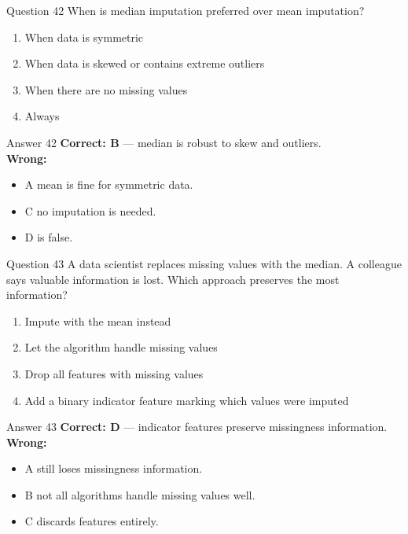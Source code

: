 \documentclass[aspectratio=169,11pt]{beamer}
\begin{document}
	\begin{frame}{Question 42}
		When is median imputation preferred over mean imputation?
		\begin{enumerate}[label=\Alph*.]
			\item When data is symmetric
			\item When data is skewed or contains extreme outliers
			\item When there are no missing values
			\item Always
		\end{enumerate}
	\end{frame}
	\begin{frame}{Answer 42}
		\textbf{Correct: B} --- median is robust to skew and outliers.\\
		\vspace{0.5em}
		\textbf{Wrong:}
		\begin{itemize}
			\item A mean is fine for symmetric data.
			\item C no imputation is needed.
			\item D is false.
		\end{itemize}
	\end{frame}
	
	\begin{frame}{Question 43}
		A data scientist replaces missing values with the median. A colleague says valuable information is lost. Which approach preserves the most information?
		\begin{enumerate}[label=\Alph*.]
			\item Impute with the mean instead
			\item Let the algorithm handle missing values
			\item Drop all features with missing values
			\item Add a binary indicator feature marking which values were imputed
		\end{enumerate}
	\end{frame}
	\begin{frame}{Answer 43}
		\textbf{Correct: D} --- indicator features preserve missingness information.\\
		\vspace{0.5em}
		\textbf{Wrong:}
		\begin{itemize}
			\item A still loses missingness information.
			\item B not all algorithms handle missing values well.
			\item C discards features entirely.
		\end{itemize}
	\end{frame}
	
\end{document}
